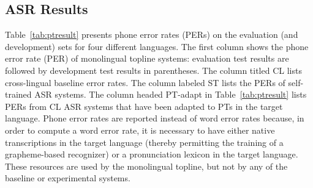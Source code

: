 \subsection{ASR Results}
\label{s6:mlbaseline}

Table~\ref{tab:ptresult} presents phone error rates (PERs) on the
evaluation (and development) sets for four different languages.
{\color{blue} The first column shows the
phone error rate (PER) of monolingual topline systems: evaluation test
results are followed by development test results in parentheses.}
The
column titled {\sc CL} lists cross-lingual baseline error rates.
The column labeled {\sc ST} lists the
PERs of self-trained ASR systems.
The column headed {\sc PT-adapt} in Table~\ref{tab:ptresult} lists
PERs from {\sc CL} ASR systems that have been adapted to PTs in the target
language.
{\color{blue} Phone error rates are reported instead of word error
rates because, in order to compute a word error rate, it is necessary
to have either native transcriptions in the target language (thereby
permitting the training of a grapheme-based recognizer) or a
pronunciation lexicon in the target language.  These resources are
used by the monolingual topline, but not by any of the baseline or
experimental systems.}



